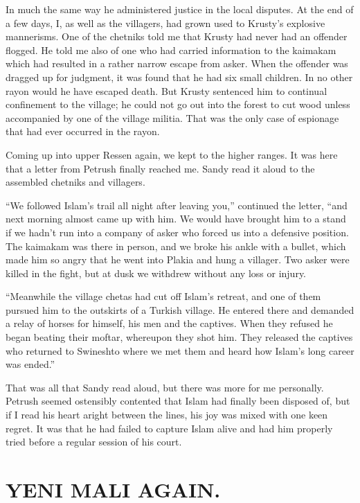 \documentclass[a5paper,12pt]{book}
\begin{document}
In much the same way he administered justice in the local disputes. At the end of a few days, I, as well as the villagers, had grown used to Krusty’s explosive mannerisms. One of the chetniks told me that Krusty had never had an offender flogged. He told me also of one who had carried information to the kaimakam which had resulted in a rather narrow escape from asker. When the offender was dragged up for judgment, it was found that he had six small children. In no other rayon would he have escaped death. But Krusty sentenced him to continual confinement to the village; he could not go out into the forest to cut wood unless accompanied by one of the village militia. That was the only case of espionage that had ever occurred in the rayon.

Coming up into upper Ressen again, we kept to the higher ranges. It was here that a letter from Petrush finally reached me. Sandy read it aloud to the assembled chetniks and villagers.

“We followed Islam's trail all night after leaving you,” continued the letter, “and next morning almost came up with him. We would have brought him to a stand if we hadn’t run into a company of asker who forced us into a defensive position. The kaimakam was there in person, and we broke his ankle with a bullet, which made him so angry that he went into Plakia and hung a villager. Two asker were killed in the fight, but at dusk we withdrew without any loss or injury.

“Meanwhile the village chetas had cut off Islam’s retreat, and one of them pursued him to the outskirts of a Turkish village. He entered there and demanded a relay of horses for himself, his men and the captives. When they refused he began beating their moftar, whereupon they shot him. They released the captives who returned to Swineshto where we met them and heard how Islam's long career was ended.”

That was all that Sandy read aloud, but there was more for me personally. Petrush seemed ostensibly contented that Islam had finally been disposed of, but if I read his heart aright between the lines, his joy was mixed with one keen regret. It was that he had failed to capture Islam alive and had him properly tried before a regular session of his court.


\chapter{YENI MALI AGAIN.}
\end{document}
